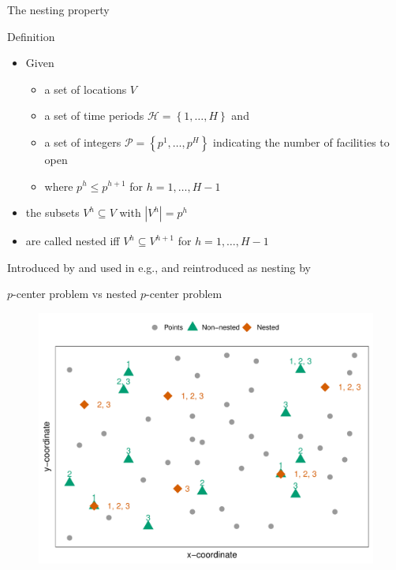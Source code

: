 \documentclass[utf8,aspectratio=169,ngerman,english]{beamer}
\renewcommand{\emph}[1]{\textcolor{jkuGreen}{#1}}
\begin{document}
\begin{frame}{The nesting property}
    \begin{block}{Definition}
        \begin{itemize}
            \item Given \pause
            \begin{itemize}
                \item a set of locations $V$
                \item a set of time periods $\mathcal{H} = \left\{1, \dots, H\right\}$ and \pause
                \item a set of integers $\mathcal P = \left\{p^1, \dots, p^H\right\}$ indicating the number of facilities to open \pause
                \item where $p^h \leq p^{h+1}$ for $h = 1, \dots, H-1$ \pause
            \end{itemize}
            \item the subsets $V^h \subseteq V$ with $|V^h| = p^h$ \pause
            \item are called \emph{nested} iff $V^h  \subseteq V^{h+1}$ for $h = 1, \dots, H-1$
        \end{itemize}
    \end{block}\pause
    Introduced by \cite{Roodman1975} and used in e.g., \cite{albareda2009multi,conforti2014integer,bakker2024value} and reintroduced as nesting by \cite{McGarvey2022}
\end{frame}

\begin{frame}{$p$-center problem vs nested $p$-center problem}
    \centering
    \begin{figure}
        \includegraphics[width=0.55\linewidth]{images/Rplot01.pdf}
    \end{figure}
\end{frame}
\end{document}

